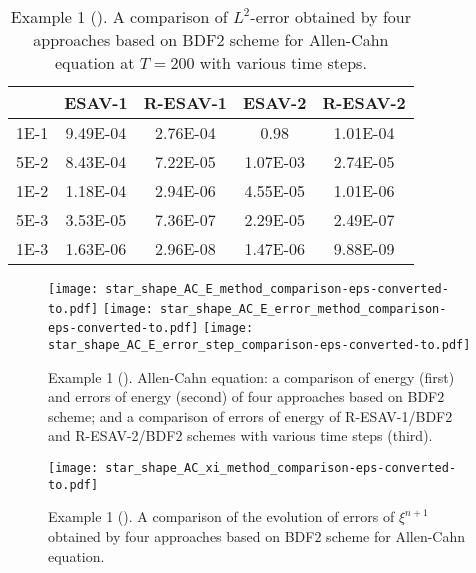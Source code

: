 \documentclass[final,review,onefignum,onetabnum]{siamart190516}
\theoremstyle{plain}
\begin{document}
\linespread{1.2}
\begin{table}[htbp] 
	\centering
	\caption{Example 1 (). A comparison of  $L^2$-error obtained by four approaches based on BDF$2$ scheme for Allen-Cahn equation at $T=200$ with various time steps.}
	 \label{table:comparison-dt-schemes}
	\begin{tabular}{||c|c|c|c|c||}
		\hline
		 & ESAV-1 & R-ESAV-1 & ESAV-2 & R-ESAV-2 \\
		\hline
	1E-1  & 9.49E-04 &  2.76E-04  & 0.98       & 1.01E-04  \\
	5E-2  & 8.43E-04 &  7.22E-05  & 1.07E-03   & 2.74E-05  \\
	1E-2  & 1.18E-04 &  2.94E-06  & 4.55E-05   & 1.01E-06  \\
	5E-3  & 3.53E-05 &  7.36E-07  & 2.29E-05   & 2.49E-07  \\
	1E-3  & 1.63E-06 &  2.96E-08  & 1.47E-06   & 9.88E-09  \\
	\hline
	\end{tabular}
\end{table}

\begin{figure}[htbp]
	\centering
	\texttt{[image: star\_shape\_AC\_E\_method\_comparison-eps-converted-to.pdf]}\hspace{-6mm} 
	\texttt{[image: star\_shape\_AC\_E\_error\_method\_comparison-eps-converted-to.pdf]} 
	\hspace{-6mm}
	\texttt{[image: star\_shape\_AC\_E\_error\_step\_comparison-eps-converted-to.pdf]}
	\hspace{-1cm}
	\caption{Example 1 (). Allen-Cahn equation: a comparison of energy (first) and errors of energy (second) of four approaches based on BDF$2$ scheme; and a comparison of errors of energy of R-ESAV-1/BDF$2$  and R-ESAV-2/BDF$2$ schemes with various time steps (third).}
		\label{Fig:AC-star-shape-energy}
\end{figure} 

\begin{figure}[htbp]
	\centering
	\texttt{[image: star\_shape\_AC\_xi\_method\_comparison-eps-converted-to.pdf]}
	\caption{Example 1 (). A comparison of the evolution of errors of $\xi^{n+1}$ obtained by four approaches based on BDF$2$ scheme for Allen-Cahn equation.}
		\label{Fig:AC-star-shape-xi}
\end{figure} 
\end{document}
